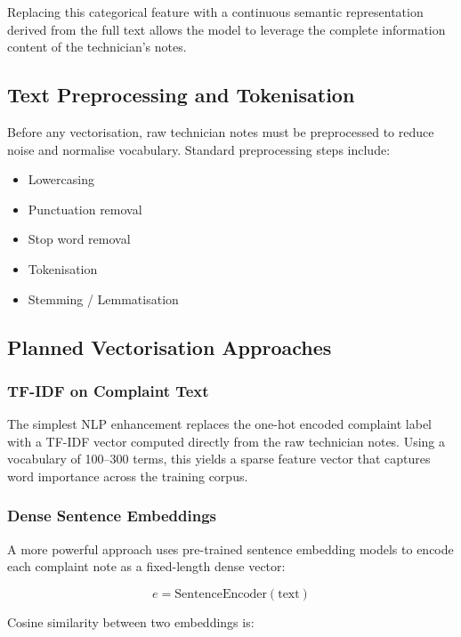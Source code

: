 \documentclass[10pt]{article}
\begin{document}
Replacing this categorical feature with a continuous semantic representation derived from the full text allows the model to leverage the complete information content of the technician's notes.

\subsection{Text Preprocessing and Tokenisation}

Before any vectorisation, raw technician notes must be preprocessed to reduce noise and normalise vocabulary. Standard preprocessing steps include:

\begin{itemize}
    \item Lowercasing
    \item Punctuation removal
    \item Stop word removal
    \item Tokenisation
    \item Stemming / Lemmatisation
\end{itemize}

\subsection{Planned Vectorisation Approaches}

\subsubsection{TF-IDF on Complaint Text}

The simplest NLP enhancement replaces the one-hot encoded complaint label with a TF-IDF vector computed directly from the raw technician notes. Using a vocabulary of 100--300 terms, this yields a sparse feature vector that captures word importance across the training corpus.

\subsubsection{Dense Sentence Embeddings}

A more powerful approach uses pre-trained sentence embedding models to encode each complaint note as a fixed-length dense vector:

\begin{equation}
e = \text{SentenceEncoder}(\text{text})
\end{equation}

Cosine similarity between two embeddings is:
\end{document}
